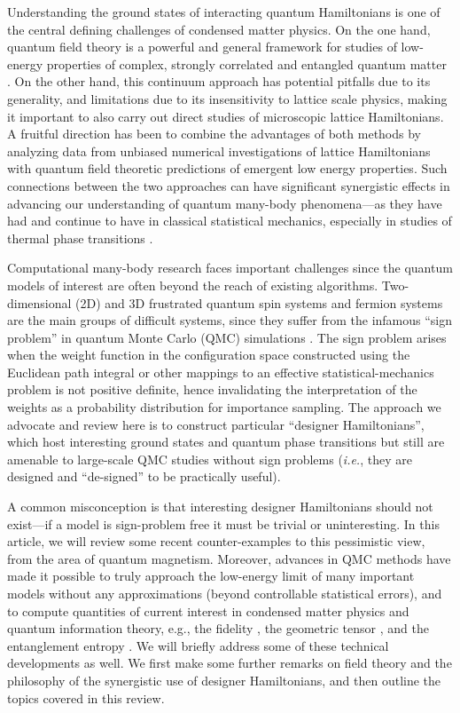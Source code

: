 \documentclass[range]{ar2e}
\begin{document}
Understanding the ground states of interacting quantum Hamiltonians is one of the central defining challenges of condensed matter physics. On the one
hand, quantum field theory is a powerful and general framework for studies of low-energy properties of complex, strongly correlated and entangled 
quantum matter \cite{Sachdev11}. On the other hand, this continuum approach has potential pitfalls due to its generality, and limitations due to its 
insensitivity to lattice scale physics, making it important to also carry out direct studies of microscopic lattice Hamiltonians. A fruitful direction 
has been to combine the advantages of both methods by analyzing data from unbiased numerical investigations of lattice Hamiltonians with quantum field 
theoretic predictions of emergent low energy properties. Such connections between the two approaches can have significant synergistic effects in advancing 
our understanding of quantum many-body phenomena---as they have had and continue to have in classical statistical mechanics, especially in studies 
of thermal phase transitions \cite{cardy1988:fss,Chaikin00}. 

Computational many-body research faces important challenges since the quantum models of interest are often beyond the reach 
of existing algorithms. Two-dimensional (2D) and 3D frustrated quantum spin systems and fermion systems are the main groups 
of difficult systems, since they suffer from the infamous ``sign problem'' in quantum Monte Carlo (QMC) simulations
\cite{Loh90,Henelius00,Nyfeler08}. The sign problem arises when the weight function in the configuration space constructed using the Euclidean path 
integral or other mappings to an effective statistical-mechanics problem is not positive definite, hence invalidating the interpretation of the weights as a probability distribution for importance sampling. The approach we advocate and review here is to construct particular 
``designer Hamiltonians'', which host interesting ground states and quantum phase transitions but still are amenable to 
large-scale QMC studies without sign problems ({\em i.e.}, they are designed and ``de-signed'' to be practically useful). 


A common misconception is that interesting designer Hamiltonians should not exist---if a model is sign-problem 
free it must be trivial or uninteresting. 
In this article, we will review some recent counter-examples to this pessimistic view, 
from the area of quantum magnetism. 
Moreover, advances in QMC 
methods \cite{Sandvik91,Evertz93,Beard96,WormA,Sandvik99,Sandvik10a} have made it possible to truly approach the 
low-energy limit of many important models without any approximations (beyond controllable statistical errors), and to compute 
quantities of current interest in condensed matter physics and quantum information theory, e.g., the fidelity 
\cite{Schwandt09}, the geometric tensor \cite{Degrandi11}, and the entanglement entropy \cite{Hastings10, Melko10}. We will 
briefly address some of these technical developments as well. We first make some further remarks on field theory and the philosophy 
of the synergistic use of designer Hamiltonians, and then outline the topics covered in this review.
\end{document}
